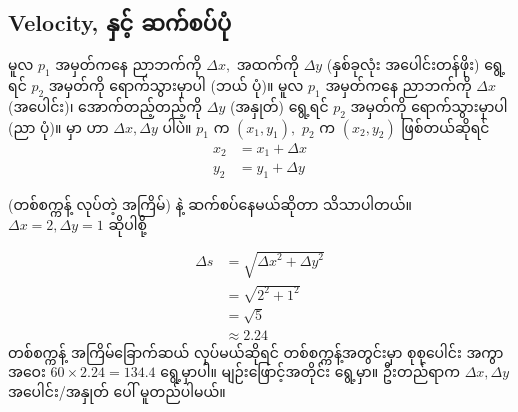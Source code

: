 \subsection*{Velocity,  နှင့်  ဆက်စပ်ပုံ}
\begin{figure}[tbh!]
\caption{} 
\label{fig:}
\end{figure}

မူလ $p_1$ အမှတ်ကနေ ညာဘက်ကို  $\Delta x,$ အထက်ကို $\Delta y$ (နှစ်ခုလုံး အပေါင်းတန်ဖိုး) ရွေ့ရင် $p_2$ အမှတ်ကို ရောက်သွားမှာပါ (ဘယ် ပုံ)။ မူလ $p_1$ အမှတ်ကနေ ညာဘက်ကို  $\Delta x$ (အပေါင်း)၊ အောက်တည့်တည့်ကို $\Delta y$ (အနှုတ်) ရွေ့ရင် $p_2$ အမှတ်ကို ရောက်သွားမှာပါ (ညာ ပုံ)။  မှာ \fEn{,}  ဟာ $\Delta x, \Delta y$ ပါပဲ။ $p_1$ က $(x_1, y_1), $  $p_2$ က $(x_2, y_2)$ ဖြစ်တယ်ဆိုရင်
\begin{align*}
x_2 &= x_1 + \Delta x \\
y_2 &= y_1 + \Delta y
\end{align*}

 (တစ်စက္ကန့်  လုပ်တဲ့ အကြိမ်) နဲ့  ဆက်စပ်နေမယ်ဆိုတာ သိသာပါတယ်။ $\Delta x = 2, \Delta y = 1$ ဆိုပါစို့

\begin{align*}
    \Delta s &= \sqrt{{\Delta x}^2 + {\Delta y}^2}\\
             &= \sqrt{2^2 + 1^2}\\
             &= \sqrt{5}\\
             &\approx 2.24
\end{align*}
တစ်စက္ကန့် အကြိမ်ခြောက်ဆယ်  လုပ်မယ်ဆိုရင် တစ်စက္ကန့်အတွင်းမှာ   စုစုပေါင်း အကွာအဝေး $60 \times 2.24 = 134.4$  ရွေ့မှာပါ။ မျဉ်းဖြောင့်အတိုင်း ရွေ့မှာ။ ဦးတည်ရာက $\Delta x, \Delta y$ အပေါင်း/အနှုတ် ပေါ် မူတည်ပါမယ်။


